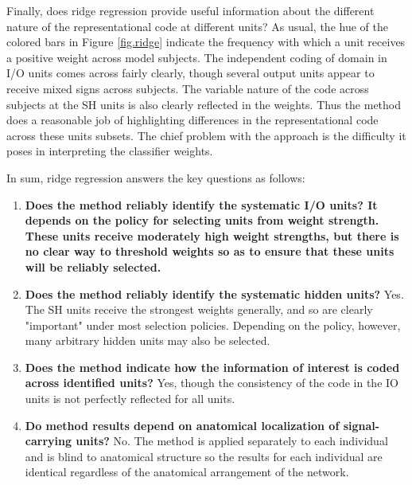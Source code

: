 Finally, does ridge regression provide useful information about the different nature of the representational code at different units? As usual, the hue of the colored bars in Figure \ref{fig.ridge} indicate the frequency with which a unit receives a positive weight across model subjects. The independent coding of domain in I/O units comes across fairly clearly, though several output units appear to receive mixed signs across subjects. The variable nature of the code across subjects at the SH units is also clearly reflected in the weights. Thus the method does a reasonable job of highlighting differences in the representational code across these units subsets. The chief problem with the approach is the difficulty it poses in interpreting the classifier weights.

In sum, ridge regression answers the key questions as follows:

\begin{enumerate}
\item \bf{Does the method reliably identify the systematic I/O units?} It depends on the policy for selecting units from weight strength. These units receive moderately high weight strengths, but there is no clear way to threshold weights so as to ensure that these units will be reliably selected.
\item {\bf Does the method reliably identify the systematic hidden units?} Yes. The SH units receive the strongest weights generally, and so are clearly "important" under most selection policies. Depending on the policy, however, many arbitrary hidden units may also be selected.
\item {\bf Does the method indicate how the information of interest is coded across identified units?} Yes, though the consistency of the code in the IO units is not perfectly reflected for all units.
\item {\bf Do method results depend on anatomical localization of signal-carrying units?} No. The method is applied separately to each individual and is blind to anatomical structure so the results for each individual are identical regardless of the anatomical arrangement of the network.
\end{enumerate}


